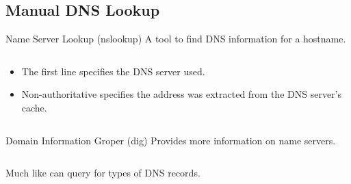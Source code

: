 \subsection{Manual DNS Lookup}
\begin{definitionbox}{Name Server Lookup (nslookup)}
    A tool to find DNS information for a hostname.
    \begin{center}
        \begin{minipage}[t]{0.9\textwidth}
            \inputminted{bash}{the_web/code/nslookup_example.sh}
        \end{minipage}
        \begin{itemize}
            \setlength\itemsep{0em}
            \item The first line specifies the DNS server used.
            \item Non-authoritative specifies the address was extracted from the DNS server's cache.
        \end{itemize}
        \begin{minipage}[t]{0.9\textwidth}
            \inputminted{bash}{the_web/code/nslookup_get_name_server.sh}
        \end{minipage}
    \end{center}
\end{definitionbox}
\begin{definitionbox}{Domain Information Groper (dig)}
    Provides more information on name servers.
    \begin{center}
        \begin{minipage}[t]{0.9\textwidth}
            \inputminted{bash}{the_web/code/dig_example.sh}
        \end{minipage}
    \end{center}
    Much like   can query for types of DNS records.
    \begin{center}
        \begin{minipage}[t]{0.9\textwidth}
            \inputminted{bash}{the_web/code/dig_mail_exchange.sh}
        \end{minipage}
    \end{center}
\end{definitionbox}

